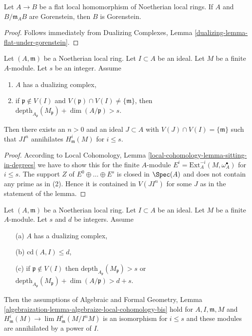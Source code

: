 \begin{lemma}
\label{lemma-flat-over-gorenstein-gorenstein-fibre}
Let $A \to B$ be a flat local homomorphism of Noetherian local rings.
If $A$ and $B/\mathfrak m_A B$ are Gorenstein, then $B$ is Gorenstein.
\end{lemma}

\begin{proof}
Follows immediately from
Dualizing Complexes, Lemma \ref{dualizing-lemma-flat-under-gorenstein}.
\end{proof}

\begin{lemma}
\label{lemma-kill-local}
Let $(A, \mathfrak m)$ be a Noetherian local ring.
Let $I \subset A$ be an ideal. Let $M$ be a finite $A$-module.
Let $s$ be an integer. Assume
\begin{enumerate}
\item $A$ has a dualizing complex,
\item if $\mathfrak p \not \in V(I)$ and
$V(\mathfrak p) \cap V(I) \not = \{\mathfrak m\}$, then
$\text{depth}_{A_\mathfrak p}(M_\mathfrak p) + \dim(A/\mathfrak p) > s$.
\end{enumerate}
Then there exists an $n > 0$ and an ideal $J \subset A$
with $V(J) \cap V(I) = \{\mathfrak m\}$ such that $JI^n$ annihilates
$H^i_\mathfrak m(M)$ for $i \leq s$.
\end{lemma}

\begin{proof}
According to
Local Cohomology, Lemma \ref{local-cohomology-lemma-sitting-in-degrees}
we have to show this for the finite $A$-module
$E^i = \text{Ext}^{-i}_A(M, \omega_A^\bullet)$
for $i \leq s$. The support $Z$ of $E^0 \oplus \ldots \oplus E^s$
is closed in $\Spec(A)$ and does not contain any prime as in (2).
Hence it is contained in $V(JI^n)$ for some $J$ as in
the statement of the lemma.
\end{proof}

\begin{lemma}
\label{lemma-algebraize-local-cohomology-bis-bis}
Let $(A, \mathfrak m)$ be a Noetherian local ring.
Let $I \subset A$ be an ideal. Let $M$ be a finite $A$-module.
Let $s$ and $d$ be integers. Assume
\begin{enumerate}
\item[(a)] $A$ has a dualizing complex,
\item[(b)] $\text{cd}(A, I) \leq d$,
\item[(c)] if $\mathfrak p \not \in V(I)$ then
$\text{depth}_{A_\mathfrak p}(M_\mathfrak p) > s$ or
$\text{depth}_{A_\mathfrak p}(M_\mathfrak p) + \dim(A/\mathfrak p) > d + s$.
\end{enumerate}
Then the assumptions of
Algebraic and Formal Geometry, Lemma
\ref{algebraization-lemma-algebraize-local-cohomology-bis} hold
for $A, I, \mathfrak m, M$ and
$H^i_\mathfrak m(M) \to \lim H^i_\mathfrak m(M/I^nM)$
is an isomorphism for $i \leq s$ and these modules are
annihilated by a power of $I$.
\end{lemma}

